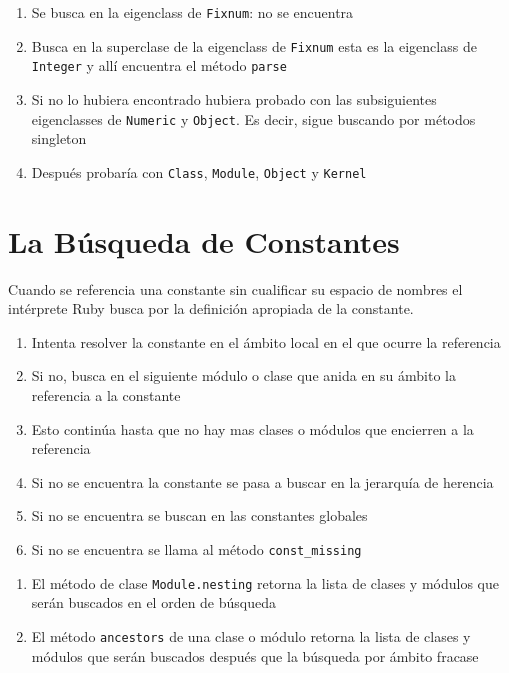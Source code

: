 \begin{enumerate}
\item
Se busca en la eigenclass de \verb|Fixnum|: no se encuentra
\item
Busca en la superclase de la eigenclass de  \verb|Fixnum| esta es la eigenclass de \verb|Integer| y allí encuentra el método \verb|parse|
\item
Si no lo hubiera encontrado hubiera probado con las subsiguientes eigenclasses de \verb|Numeric| y \verb|Object|. 
Es decir, sigue buscando por métodos singleton
\item
Después probaría con \verb|Class|,
\verb|Module|,
\verb|Object| y \verb|Kernel|
\end{enumerate}

\section{La Búsqueda de Constantes}
\label{section:busqueda_de_constantes}
Cuando se referencia una constante sin cualificar su espacio de nombres el intérprete 
Ruby busca por la definición apropiada de la constante.

\begin{enumerate}
\item
Intenta resolver la constante en el ámbito local en el que ocurre la referencia
\item
Si no, busca en el siguiente módulo o clase que anida en su ámbito
la referencia a la constante
\item
Esto continúa hasta que no hay mas clases o módulos que encierren a la referencia
\item
Si no se encuentra la constante se pasa a buscar en la jerarquía de herencia
\item
Si no se encuentra se buscan en las constantes globales
\item
Si no se encuentra se llama al método \verb|const_missing|
\end{enumerate}

\begin{enumerate}
\item 
El método de clase \verb|Module.nesting| retorna la lista de clases y módulos que serán buscados
en el orden de búsqueda
\item
El método \verb|ancestors| de una clase o módulo retorna la lista de clases y módulos
que serán buscados después que la búsqueda por ámbito fracase
\end{enumerate}


